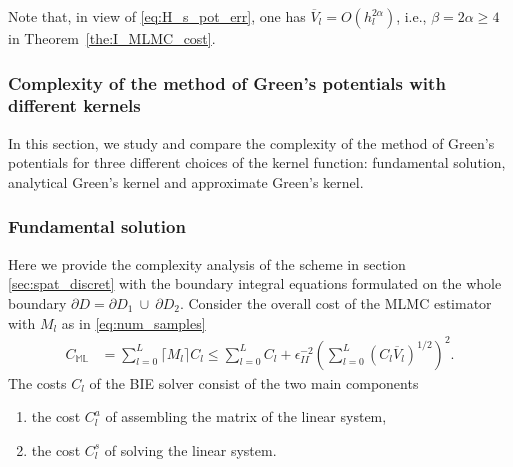 Note that, in view of \eqref{eq:H_s_pot_err}, one has $\overline{V}_l = O(h_l^{2 \alpha})$, i.e., $\beta = 2 \alpha \geq 4$ in Theorem~\ref{the:I_MLMC_cost}.
 


\subsubsection{Complexity of the method of Green's potentials with different kernels}

In this section, we study and compare the complexity of the method of Green's potentials for three different choices of the kernel function: fundamental solution, analytical Green's kernel and approximate Green's kernel.

\subsubsection{Fundamental solution}
\label{sec:Schur_complexity}



Here we provide the complexity analysis of the scheme in section \ref{sec:spat_discret} with the boundary integral equations formulated on the whole boundary $\partial D = \partial D_1~\cup~\partial D_2$.
Consider the overall cost of the MLMC estimator with $M_l$ as in \eqref{eq:num_samples}
\begin{align*}%
	C_{\mathbb{ML}} 
	&= \sum_{l=0}^L \Big \lceil M_l \Big \rceil {C}_l 
	\leq 
	\sum_{l=0}^L {C}_l + \epsilon_{II}^{-2} \left( \sum_{l=0}^L ({C_l} \overline{V}_l )^{1/2} \right)^2
	.
\end{align*}
The costs $C_l$ of the BIE solver consist of the two main components
\begin{enumerate}
	\item the cost $C^a_l$ of assembling the matrix of the linear system,
	\item the cost $C^s_l$ of solving the linear system.
\end{enumerate}

